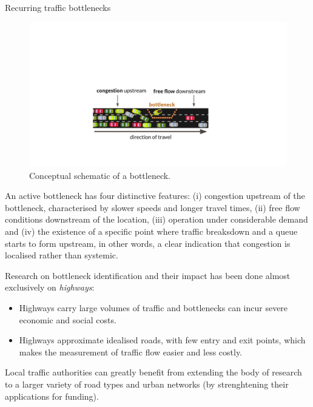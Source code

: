 \documentclass[final]{beamer}
\newlength{\colwidth}
\begin{document}
\begin{frame}[t]
\begin{columns}[t]
\begin{column}{\colwidth}
\begin{block}{Recurring traffic bottlenecks}

    \begin{figure}
      \vspace{-0.5cm}
      \includegraphics[width=0.95\linewidth]{bottleneck.pdf}
      \caption{Conceptual schematic of a bottleneck.}
      \label{fig:}
    \end{figure}

    An active bottleneck has four distinctive features:
    (i) congestion upstream of the bottleneck,
    characterised by slower speeds and longer travel times, (ii) free flow
    conditions downstream of the location, (iii) operation under
    considerable demand and (iv) the existence of a specific point where traffic
    breaksdown and a queue starts to form upstream, in other words, a clear
    indication that congestion is localised rather than systemic.


    Research on bottleneck identification and their impact has been done
    almost exclusively on \emph{highways}:

    \begin{itemize}
      \item Highways carry large volumes of traffic and bottlenecks can
            incur severe economic and social costs.
      \item Highways approximate idealised roads, with few entry and exit
            points, which makes the measurement of traffic flow easier and less
            costly.
    \end{itemize}

    Local traffic authorities can greatly benefit from extending the body of
    research to a larger variety of road types and urban networks
    (by strenghtening their applications for funding).


\end{block}
\end{column}
\end{columns}
\end{frame}
\end{document}
